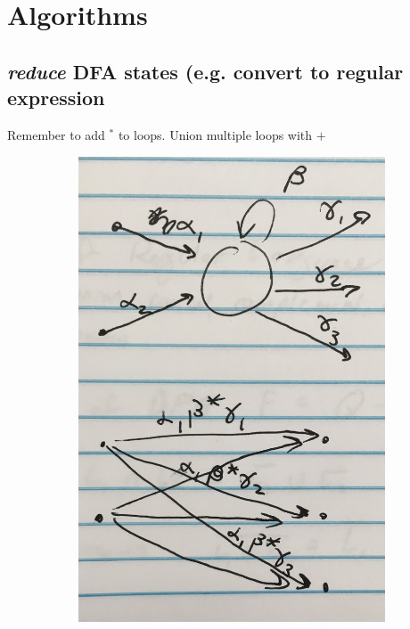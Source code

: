 \documentclass[20pt]{article} %
\begin{document}
\newpage
\section{Algorithms}
\subsection{\textit{reduce} DFA states (e.g. convert to \textbf{regular expression}}
Remember to add $^{*}$ to loops.  Union multiple loops with $+$
\begin{figure}[!htbp]
  	\centering
   	\begin{subfigure}[p]{0.5\linewidth}
    	\includegraphics[width=\linewidth]{./figures/f-1.jpg}
   	\end{subfigure}
\end{figure}
\end{document}
